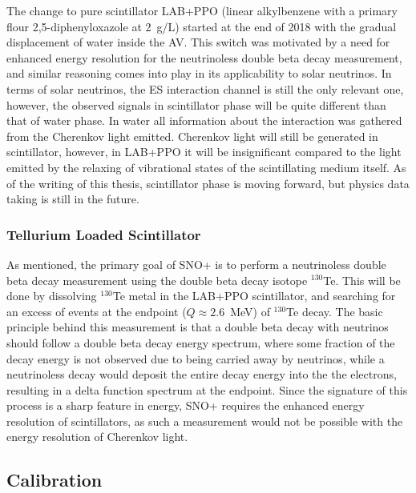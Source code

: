 The change to pure scintillator LAB+PPO (linear alkylbenzene with a primary flour 2,5-diphenyloxazole at 2~g/L) started at the end of 2018 with the gradual displacement of water inside the AV.
This switch was motivated by a need for enhanced energy resolution for the neutrinoless double beta decay measurement, and similar reasoning comes into play in its applicability to solar neutrinos.
In terms of solar neutrinos, the ES interaction channel is still the only relevant one, however, the observed signals in scintillator phase will be quite different than that of water phase.
In water all information about the interaction was gathered from the Cherenkov light emitted. 
Cherenkov light will still be generated in scintillator, however, in LAB+PPO it will be insignificant compared to the light emitted by the relaxing of vibrational states of the scintillating medium itself.
As of the writing of this thesis, scintillator phase is moving forward, but physics data taking is still in the future.

\subsubsection{Tellurium Loaded Scintillator}
As mentioned, the primary goal of SNO+ is to perform a neutrinoless double beta decay measurement using the double beta decay isotope $^{130}$Te.
This will be done by dissolving $^{130}$Te metal in the LAB+PPO scintillator, and searching for an excess of events at the endpoint ($Q \approx 2.6$~MeV) of $^{130}$Te decay.
The basic principle behind this measurement is that a double beta decay with neutrinos should follow a double beta decay energy spectrum, where some fraction of the decay energy is not observed due to being carried away by neutrinos, while a neutrinoless decay would deposit the entire decay energy into the the electrons, resulting in a delta function spectrum at the endpoint.
Since the signature of this process is a sharp feature in energy, SNO+ requires the enhanced energy resolution of scintillators, as such a measurement would not be possible with the energy resolution of Cherenkov light.

\subsection{Calibration}

